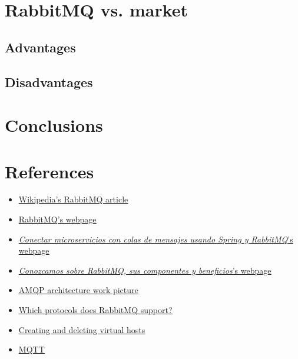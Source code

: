\documentclass[4paper,12pt]{article}
\begin{document}
\section*{RabbitMQ vs. market}
\justify{}

\newpage

\subsection*{Advantages}
\justify{}

\subsection*{Disadvantages}
\justify{}

\section*{Conclusions}
\justify{}

\section*{References}
\begin{itemize}
    \item \href{https://en.wikipedia.org/wiki/RabbitMQ}{\underline{Wikipedia's RabbitMQ article}}
    \item \href{https://www.rabbitmq.com}{\underline{RabbitMQ's webpage}}
    \item \href{https://www.sdos.es/blog/microservicios-mensajes-spring-rabbitmq}{\underline{\textit{Conectar microservicios con colas de mensajes usando Spring y RabbitMQ}'s webpage}}
    \item \href{https://www.pragma.com.co/academia/lecciones/conozcamos-sobre-rabbitmq-sus-componentes-y-beneficios}{\underline{\textit{Conozcamos sobre RabbitMQ, sus componentes y beneficios}'s webpage}}
    \item \href{https://www.researchgate.net/publication/325119432/figure/fig5/AS:626093459505153@1526283721309/AMQP-architecture-34.png}{\underline{AMQP architecture work picture}}
    \item \href{https://www.rabbitmq.com/protocols.html}{\underline{Which protocols does RabbitMQ support?}}
    \item \href{https://www.rabbitmq.com/vhosts.html}{\underline{Creating and deleting virtual hosts}}
    \item \href{https://www.luisllamas.es/que-es-mqtt-su-importancia-como-protocolo-iot/}{\underline{MQTT}}
\end{itemize}
\end{document}
